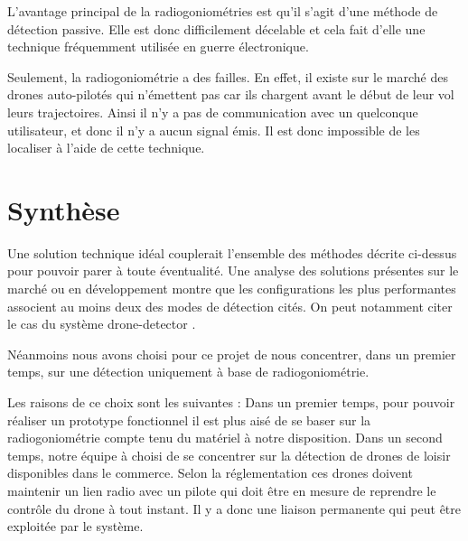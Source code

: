 L'avantage principal de la radiogoniométries est qu'il s'agit d'une méthode de détection passive. Elle est donc difficilement décelable et cela fait d'elle une technique fréquemment utilisée en guerre électronique. 

Seulement, la radiogoniométrie a des failles. En effet, il existe sur le marché des drones auto-pilotés qui n'émettent pas car ils chargent avant le début de leur vol leurs trajectoires. Ainsi il n'y a pas de communication avec un quelconque utilisateur, et donc il n'y a aucun signal émis. Il est donc impossible de les localiser à l'aide de cette technique.





\section{Synthèse}

Une solution technique idéal couplerait l'ensemble des méthodes décrite ci-dessus pour pouvoir parer à toute éventualité. Une analyse des solutions présentes sur le marché ou en développement montre que les configurations les plus performantes associent au moins deux des modes de détection cités. On peut notamment citer le cas du système drone-detector \cite{dronedetector}.

Néanmoins nous avons choisi pour ce projet de nous concentrer, dans un premier temps, sur une détection uniquement à base de radiogoniométrie.

Les raisons de ce choix sont les suivantes : Dans un premier temps, pour pouvoir réaliser un prototype fonctionnel il est plus aisé de se baser sur la radiogoniométrie compte tenu du matériel à notre disposition. Dans un second temps, notre équipe à choisi de se concentrer sur la détection de drones de loisir disponibles dans le commerce. Selon la réglementation ces drones doivent maintenir un lien radio avec un pilote qui doit être en mesure de reprendre le contrôle du drone à tout instant. Il y a donc une liaison permanente qui peut être exploitée par le système.







